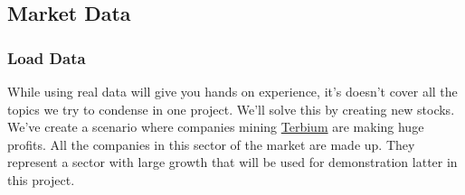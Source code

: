 \documentclass[11pt]{article}
\begin{document}
    
    
    \hypertarget{market-data}{%
\subsection{Market Data}\label{market-data}}

\hypertarget{load-data}{%
\subsubsection{Load Data}\label{load-data}}

While using real data will give you hands on experience, it's doesn't
cover all the topics we try to condense in one project. We'll solve this
by creating new stocks. We've create a scenario where companies mining
\href{https://en.wikipedia.org/wiki/Terbium}{Terbium} are making huge
profits. All the companies in this sector of the market are made up.
They represent a sector with large growth that will be used for
demonstration latter in this project.
\end{document}
